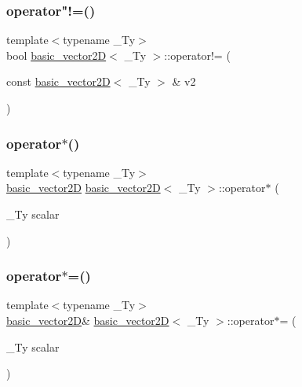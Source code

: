 \subsubsection{\texorpdfstring{operator"!=()}{operator!=()}}
{\footnotesize\ttfamily template$<$typename \+\_\+\+Ty$>$ \\
bool \hyperlink{structbasic__vector2_d}{basic\+\_\+vector2D}$<$ \+\_\+\+Ty $>$\+::operator!= (\begin{DoxyParamCaption}\item[{const \hyperlink{structbasic__vector2_d}{basic\+\_\+vector2D}$<$ \+\_\+\+Ty $>$ \&}]{v2 }\end{DoxyParamCaption})\hspace{0.3cm}{\ttfamily [inline]}}

\mbox{\label{structbasic__vector2_d_a749249ddf6d61699428d2dee790dfd9a}} 
\subsubsection{\texorpdfstring{operator$\ast$()}{operator*()}}
{\footnotesize\ttfamily template$<$typename \+\_\+\+Ty$>$ \\
\hyperlink{structbasic__vector2_d}{basic\+\_\+vector2D} \hyperlink{structbasic__vector2_d}{basic\+\_\+vector2D}$<$ \+\_\+\+Ty $>$\+::operator$\ast$ (\begin{DoxyParamCaption}\item[{\+\_\+\+Ty}]{scalar }\end{DoxyParamCaption})\hspace{0.3cm}{\ttfamily [inline]}}

\mbox{\label{structbasic__vector2_d_aab570d392ff446a6e16f6ca648ee65c6}} 
\subsubsection{\texorpdfstring{operator$\ast$=()}{operator*=()}}
{\footnotesize\ttfamily template$<$typename \+\_\+\+Ty$>$ \\
\hyperlink{structbasic__vector2_d}{basic\+\_\+vector2D}\& \hyperlink{structbasic__vector2_d}{basic\+\_\+vector2D}$<$ \+\_\+\+Ty $>$\+::operator$\ast$= (\begin{DoxyParamCaption}\item[{\+\_\+\+Ty}]{scalar }\end{DoxyParamCaption})\hspace{0.3cm}{\ttfamily [inline]}}

